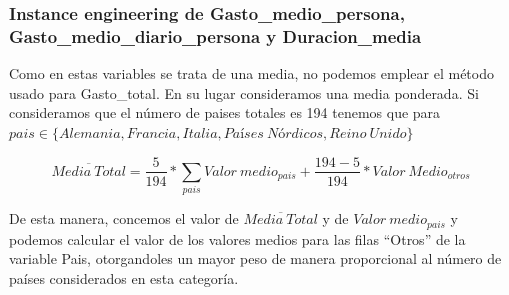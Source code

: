 \documentclass[data,article,submit,moreauthors,pdftex]{Definitions/mdpi}
\newenvironment{Shaded}{\begin{snugshade}}{\end{snugshade}}
\newcommand{\ControlFlowTok}[1]{\textcolor[rgb]{0.13,0.29,0.53}{\textbf{#1}}}
\newcommand{\DecValTok}[1]{\textcolor[rgb]{0.00,0.00,0.81}{#1}}
\newcommand{\FunctionTok}[1]{\textcolor[rgb]{0.13,0.29,0.53}{\textbf{#1}}}
\newcommand{\NormalTok}[1]{#1}
\newcommand{\OtherTok}[1]{\textcolor[rgb]{0.56,0.35,0.01}{#1}}
\newcommand{\SpecialCharTok}[1]{\textcolor[rgb]{0.81,0.36,0.00}{\textbf{#1}}}
\newcommand{\StringTok}[1]{\textcolor[rgb]{0.31,0.60,0.02}{#1}}
\begin{document}
\begin{Shaded}
\end{Shaded}

\subsubsection{Instance engineering de Gasto\_medio\_persona,
Gasto\_medio\_diario\_persona y
Duracion\_media}\label{instance-engineering-de-gasto_medio_persona-gasto_medio_diario_persona-y-duracion_media}

Como en estas variables se trata de una media, no podemos emplear el
método usado para Gasto\_total. En su lugar consideramos una media
ponderada. Si consideramos que el número de paises totales es 194
tenemos que para
\(pais \in \{Alemania, Francia,Italia, Países\ Nórdicos, Reino\ Unido\}\)

\[
 \overline{Media\ Total} = \frac{5}{194}*\sum_{pais}{Valor\ medio}_{pais} + \frac{194-5}{194}*Valor \ Medio_{otros}
\]

De esta manera, concemos el valor de \(\overline{Media\ Total}\) y de
\({Valor\ medio}_{pais}\) y podemos calcular el valor de los valores
medios para las filas ``Otros'' de la variable Pais, otorgandoles un
mayor peso de manera proporcional al número de países considerados en
esta categoría.
\end{document}
